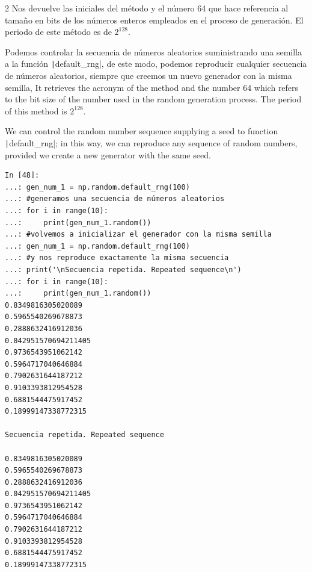 \begin{paracol}{2}
Nos devuelve las iniciales del método y el número 64 que hace referencia al tamaño en bits de los números enteros empleados en el proceso de generación. El periodo de este método es de $2^{128}$.

Podemos controlar la secuencia de números aleatorios suministrando una semilla a la función \texttt|default_rng|, de este modo, podemos reproducir cualquier secuencia de números aleatorios, siempre que creemos un nuevo generador con la misma semilla,
\switchcolumn
It retrieves the acronym of the method and the number 64 which refers to the bit size of the number used in the random generation process. The period of this method is $2^{128}$.

We can control the random number sequence supplying a seed to function \texttt|default_rng|; in this way, we can reproduce any sequence of random numbers, provided we create a new generator with the same seed. 
\end{paracol}
\begin{verbatim}
In [48]: 
...: gen_num_1 = np.random.default_rng(100)
...: #generamos una secuencia de números aleatorios
...: for i in range(10):
...:     print(gen_num_1.random())
...: #volvemos a inicializar el generador con la misma semilla
...: gen_num_1 = np.random.default_rng(100)
...: #y nos reproduce exactamente la misma secuencia
...: print('\nSecuencia repetida. Repeated sequence\n')
...: for i in range(10):
...:     print(gen_num_1.random())
0.8349816305020089
0.5965540269678873
0.2888632416912036
0.042951570694211405
0.9736543951062142
0.5964717040646884
0.7902631644187212
0.9103393812954528
0.6881544475917452
0.18999147338772315

Secuencia repetida. Repeated sequence

0.8349816305020089
0.5965540269678873
0.2888632416912036
0.042951570694211405
0.9736543951062142
0.5964717040646884
0.7902631644187212
0.9103393812954528
0.6881544475917452
0.18999147338772315
\end{verbatim}


